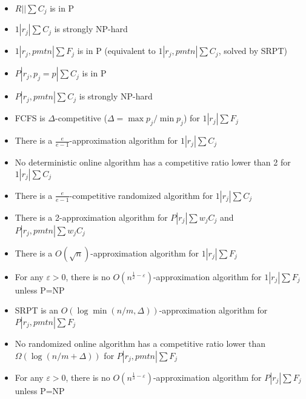 \documentclass{article}
\begin{document}
\begin{itemize}
    \item \(R||\sum C_j\) is in P \cite{bruno1974scheduling}
    \item \(1|r_j|\sum C_j\) is strongly NP-hard \cite{lenstra1977complexity}
    \item \(1|r_j,\mathit{pmtn}|\sum F_j\) is in P (equivalent to \(1|r_j,\mathit{pmtn}|\sum C_j\),
    solved by SRPT)
    \item \(P|r_j,p_j=p|\sum C_j\) is in P \cite{simons1983multiprocessor}
    \item \(P|r_j,\mathit{pmtn}|\sum C_j\) is strongly NP-hard \cite{bellenguez2015note}
    \item FCFS is \(\Delta\)-competitive (\(\Delta=\max p_j/\min p_j\)) for \(1|r_j|\sum F_j\)
    \cite{legrand2008minimizing}
    \item There is a \(\frac{e}{e-1}\)-approximation algorithm for \(1|r_j|\sum C_j\) \cite{chekuri2001approximation}
    \item No deterministic online algorithm has a competitive ratio lower than 2 for \(1|r_j|\sum
    C_j\) \cite{chekuri2001approximation}
    \item There is a \(\frac{e}{e-1}\)-competitive randomized algorithm for \(1|r_j|\sum C_j\)
    \cite{chekuri2001approximation}
    \item There is a 2-approximation algorithm for \(P|r_j|\sum w_jC_j\) and
    \(P|r_j,\mathit{pmtn}|\sum w_jC_j\) \cite{schulz1997scheduling}
    \item There is a \(O(\sqrt{n})\)-approximation algorithm for \(1|r_j|\sum F_j\)
    \cite{kellerer1996approximability}
    \item For any \(\varepsilon>0\), there is no \(O(n^{\frac{1}{2}-\varepsilon})\)-approximation
    algorithm for \(1|r_j|\sum F_j\) unless P=NP \cite{kellerer1996approximability}
    \item SRPT is an \(O(\log\min(n/m,\Delta))\)-approximation algorithm for
    \(P|r_j,\mathit{pmtn}|\sum F_j\) \cite{leonardi1997approximating}
    \item No randomized online algorithm has a competitive ratio lower than
    \(\Omega(\log(n/m+\Delta))\) for \(P|r_j,\mathit{pmtn}|\sum F_j\)
    \cite{leonardi1997approximating}
    \item For any \(\varepsilon>0\), there is no \(O(n^{\frac{1}{3}-\varepsilon})\)-approximation
    algorithm for \(P|r_j|\sum F_j\) unless P=NP \cite{leonardi1997approximating}
\end{itemize}
\end{document}
